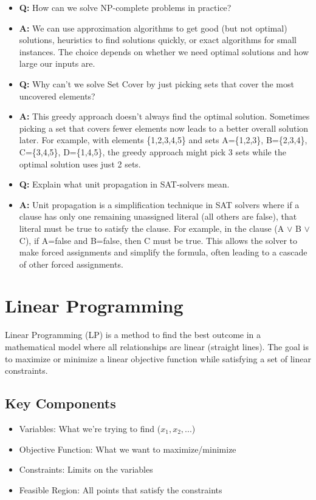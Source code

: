 \documentclass[11pt,a4paper]{article}
\begin{document}
\begin{multicols}{2}
\begin{itemize}
    \item \textbf{Q:} How can we solve NP-complete problems in practice?
    \item \textbf{A:} We can use approximation algorithms to get good (but not optimal) solutions, heuristics to find solutions quickly, or exact algorithms for small instances. The choice depends on whether we need optimal solutions and how large our inputs are.

    \item \textbf{Q:} Why can't we solve Set Cover by just picking sets that cover the most uncovered elements?
    \item \textbf{A:} This greedy approach doesn't always find the optimal solution. Sometimes picking a set that covers fewer elements now leads to a better overall solution later. For example, with elements \{1,2,3,4,5\} and sets A=\{1,2,3\}, B=\{2,3,4\}, C=\{3,4,5\}, D=\{1,4,5\}, the greedy approach might pick 3 sets while the optimal solution uses just 2 sets.

    \item \textbf{Q:} Explain what unit propagation in SAT-solvers mean.
    \item \textbf{A:} Unit propagation is a simplification technique in SAT solvers where if a clause has only one remaining unassigned literal (all others are false), that literal must be true to satisfy the clause.
    For example, in the clause (A $\lor$ B $\lor$ C), if A=false and B=false, then C must be true. This allows the solver to make forced assignments and simplify the formula, often leading to a cascade of other forced assignments.
\end{itemize}

\section{Linear Programming}
Linear Programming (LP) is a method to find the best outcome in a mathematical model where all relationships are linear (straight lines). The goal is to maximize or minimize a linear objective function while satisfying a set of linear constraints.

\subsection{Key Components}
\begin{itemize}
    \item Variables: What we're trying to find ($x_1, x_2, ...$)
    \item Objective Function: What we want to maximize/minimize
    \item Constraints: Limits on the variables
    \item Feasible Region: All points that satisfy the constraints
\end{itemize}


\end{multicols}
\end{document}
